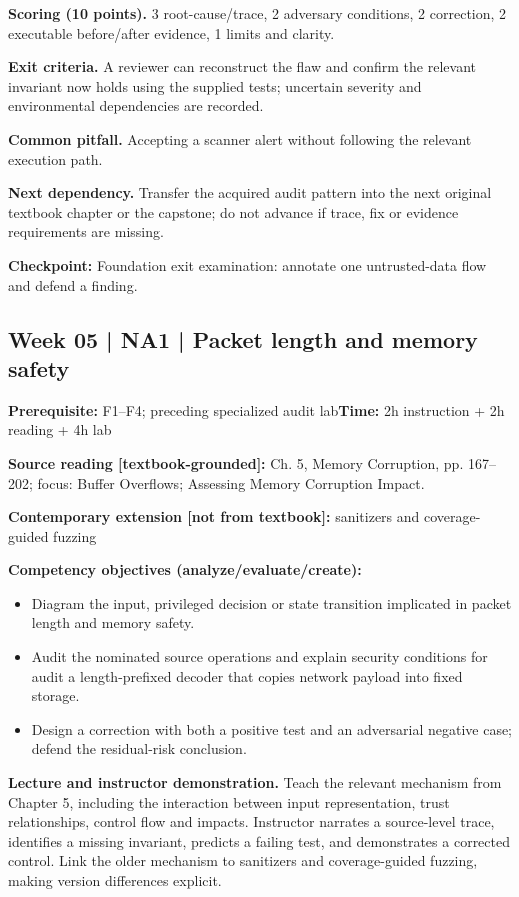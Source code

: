 \documentclass[10pt,letterpaper]{article}
\begin{document}
\textbf{Scoring (10 points).} 3 root-cause/trace, 2 adversary conditions, 2 correction, 2 executable before/after evidence, 1 limits and clarity.

\textbf{Exit criteria.} A reviewer can reconstruct the flaw and confirm the relevant invariant now holds using the supplied tests; uncertain severity and environmental dependencies are recorded.

\textbf{Common pitfall.} Accepting a scanner alert without following the relevant execution path.

\textbf{Next dependency.} Transfer the acquired audit pattern into the next original textbook chapter or the capstone; do not advance if trace, fix or evidence requirements are missing.

\begin{historynote}\textbf{Checkpoint:} Foundation exit examination: annotate one untrusted-data flow and defend a finding.\end{historynote}
\subsection{Week 05 | NA1 | Packet length and memory safety}
\textbf{Prerequisite:} F1--F4; preceding specialized audit lab\hfill\textbf{Time:} 2h instruction + 2h reading + 4h lab

\textbf{Source reading [textbook-grounded]:} Ch. 5, Memory Corruption, pp. 167--202; focus: Buffer Overflows; Assessing Memory Corruption Impact.

\textbf{Contemporary extension [not from textbook]:} sanitizers and coverage-guided fuzzing

\textbf{Competency objectives (analyze/evaluate/create):}
\begin{itemize}[leftmargin=*,itemsep=2pt]
\item Diagram the input, privileged decision or state transition implicated in packet length and memory safety.
\item Audit the nominated source operations and explain security conditions for audit a length-prefixed decoder that copies network payload into fixed storage.
\item Design a correction with both a positive test and an adversarial negative case; defend the residual-risk conclusion.
\end{itemize}
\textbf{Lecture and instructor demonstration.} Teach the relevant mechanism from Chapter 5, including the interaction between input representation, trust relationships, control flow and impacts. Instructor narrates a source-level trace, identifies a missing invariant, predicts a failing test, and demonstrates a corrected control. Link the older mechanism to sanitizers and coverage-guided fuzzing, making version differences explicit.
\end{document}
